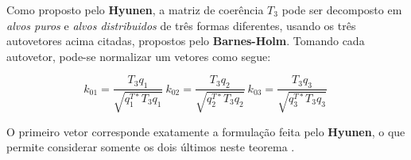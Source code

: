\documentclass{article}
\begin{document}
Como proposto pelo \textbf{Hyunen}, a matriz de coerência $T_{3}$ pode ser decomposto em \textit{alvos puros} e \textit{alvos distribuidos} de três formas diferentes, usando os três autovetores acima citadas, propostos pelo \textbf{Barnes-Holm}. 
Tomando cada autovetor, pode-se normalizar um vetores como segue:

\begin{equation}
    k_{01} = \frac{T_{3}q_{1}}{\sqrt{q_{1}^{T*}T_{3}q_{1}}} \    
    k_{02} = \frac{T_{3}q_{2}}{\sqrt{q_{2}^{T*}T_{3}q_{2}}} \    
    k_{03} = \frac{T_{3}q_{3}}{\sqrt{q_{3}^{T*}T_{3}q_{3}}} \ 
\end{equation}

O primeiro vetor corresponde exatamente a formulação feita pelo \textbf{Hyunen}, o que permite considerar somente os dois últimos neste teorema \cite{jong:2009}.



\end{document}
